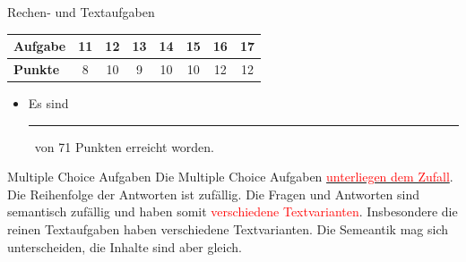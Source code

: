 \documentclass[a4paper, 9pt]{scrartcl}\usepackage[]{graphicx}\usepackage[]{xcolor}
\begin{document}
\begin{graybox}{Rechen- und Textaufgaben}
  \begin{center}
    \large
    \begin{tabular}{|l|c|c|c|c|c|c|c|}
      \hline
      \textbf{Aufgabe} & \textbf{11} & \textbf{12} & \textbf{13} & \textbf{14} & \textbf{15} & \textbf{16} & \textbf{17} \strut\\
      \hline
      \textbf{Punkte} & 
      \hspace{1Ex}\Large\textcolor{gray!70}{8}\hspace{1Ex}  & 
      \hspace{1Ex}\Large\textcolor{gray!70}{10}\hspace{1Ex}  & 
      \hspace{1Ex}\Large\textcolor{gray!70}{9}\hspace{1Ex}  & 
      \hspace{1Ex}\Large\textcolor{gray!70}{10}\hspace{1Ex}  & 
      \hspace{1Ex}\Large\textcolor{gray!70}{10}\hspace{1Ex}  & 
      \hspace{1Ex}\Large\textcolor{gray!70}{12}\hspace{1Ex}  & 
      \hspace{1Ex}\Large\textcolor{gray!70}{12}\hspace{1Ex} \strut\\
      \hline
  \end{tabular}
\end{center}
\begin{itemize}
\item Es sind \rule[0ex]{2em}{.4pt}\, von 71 Punkten erreicht worden.
\end{itemize}
\end{graybox}

\clearpage
\begin{graybox}{Multiple Choice Aufgaben}
Die Multiple Choice Aufgaben \underline{\textcolor{red}{unterliegen dem Zufall}}. Die Reihenfolge der Antworten ist zufällig. Die Fragen und Antworten sind semantisch zufällig und haben somit \textcolor{red}{verschiedene Textvarianten}. Insbesondere die reinen Textaufgaben haben verschiedene Textvarianten. Die Semeantik mag sich unterscheiden, die Inhalte sind aber gleich.
\end{graybox}
\end{document}
